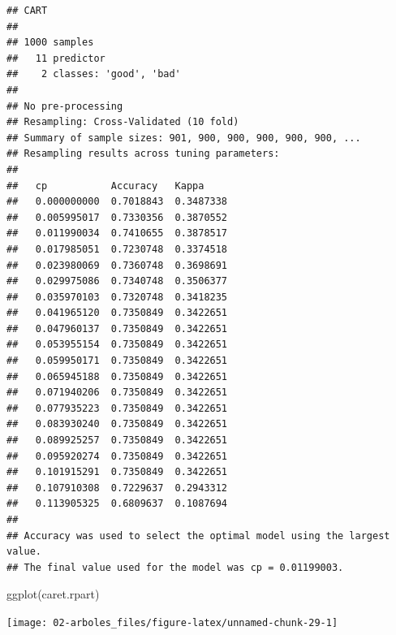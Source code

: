 \documentclass[
]{book}
\newenvironment{Shaded}{\begin{snugshade}}{\end{snugshade}}
\newcommand{\FunctionTok}[1]{\textcolor[rgb]{0.00,0.00,0.00}{#1}}
\newcommand{\NormalTok}[1]{#1}
\newcommand{\SpecialCharTok}[1]{\textcolor[rgb]{0.00,0.00,0.00}{#1}}
\theoremstyle{break}
\theoremstyle{definition}
\theoremstyle{definition}
\theoremstyle{definition}
\theoremstyle{definition}
\theoremstyle{remark}
\begin{document}
\begin{verbatim}
## CART 
## 
## 1000 samples
##   11 predictor
##    2 classes: 'good', 'bad' 
## 
## No pre-processing
## Resampling: Cross-Validated (10 fold) 
## Summary of sample sizes: 901, 900, 900, 900, 900, 900, ... 
## Resampling results across tuning parameters:
## 
##   cp           Accuracy   Kappa    
##   0.000000000  0.7018843  0.3487338
##   0.005995017  0.7330356  0.3870552
##   0.011990034  0.7410655  0.3878517
##   0.017985051  0.7230748  0.3374518
##   0.023980069  0.7360748  0.3698691
##   0.029975086  0.7340748  0.3506377
##   0.035970103  0.7320748  0.3418235
##   0.041965120  0.7350849  0.3422651
##   0.047960137  0.7350849  0.3422651
##   0.053955154  0.7350849  0.3422651
##   0.059950171  0.7350849  0.3422651
##   0.065945188  0.7350849  0.3422651
##   0.071940206  0.7350849  0.3422651
##   0.077935223  0.7350849  0.3422651
##   0.083930240  0.7350849  0.3422651
##   0.089925257  0.7350849  0.3422651
##   0.095920274  0.7350849  0.3422651
##   0.101915291  0.7350849  0.3422651
##   0.107910308  0.7229637  0.2943312
##   0.113905325  0.6809637  0.1087694
## 
## Accuracy was used to select the optimal model using the largest value.
## The final value used for the model was cp = 0.01199003.
\end{verbatim}

\begin{Shaded}
\begin{Highlighting}[]
\FunctionTok{ggplot}\NormalTok{(caret.rpart)}
\end{Highlighting}
\end{Shaded}

\begin{center}\texttt{[image: 02-arboles\_files/figure-latex/unnamed-chunk-29-1]} \end{center}

\begin{Shaded}
\end{Shaded}
\end{document}
